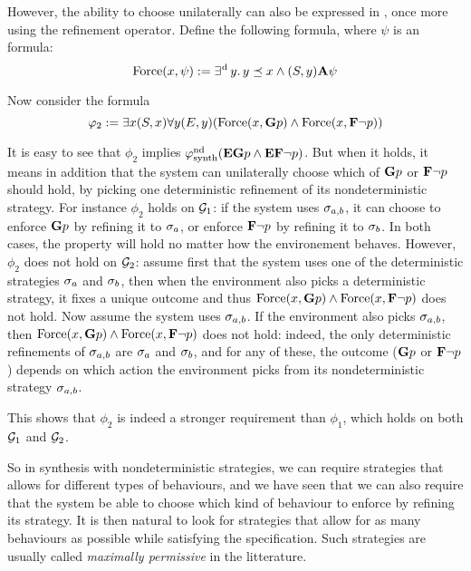   
However, the ability to choose unilaterally can also be expressed in
\SLref, once more using the refinement operator.
Define the following formula, where $\psi$ is an \LTL formula:
\[\text{Force}(x,\psi):=\operatorname*{\exists^{\hskip.5pt\text{d}}} y.\, y\preceq x
  \wedge (S,y){\bf A}\psi\]

Now consider the formula
\[\varphi_2:=\exists x (S,x) \forall y (E,y) (\text{Force}(x, {\bf G} p)
  \wedge \text{Force}(x,{\bf F} \neg p))\]

It is easy to see that $\phi_2$ implies $\varphi^{\text{nd}}_{\text{synth}}({\bf E}{\bf G} p
\wedge {\bf E}{\bf F}\neg p)$. But when it holds, it means in addition that the
system can unilaterally choose which of ${\bf G} p$ or ${\bf F}\neg p$
should hold, by picking one deterministic refinement of its
nondeterministic strategy. For instance $\phi_2$  holds on $\CGS_1$:
if the system uses $\sigma_{a,b}$, it can choose to enforce
${\bf G} p$ by refining it to $\sigma_a$, or
enforce ${\bf F}\neg p$ by  refining it to $\sigma_b$.
In both cases, the property will hold no matter how the environement
behaves.
However, $\phi_2$ does not hold on $\CGS_2$: assume first that the system uses one of
the deterministic strategies $\sigma_a$ and $\sigma_b$, then when the
environment also picks a deterministic strategy, it fixes a unique
outcome and thus $\text{Force}(x, {\bf G} p)
  \wedge \text{Force}(x,{\bf F} \neg p)$ does not hold. Now assume  the system
  uses $\sigma_{a,b}$. If the environment also picks $\sigma_{a,b}$,
  then $\text{Force}(x, {\bf G} p)
  \wedge \text{Force}(x,{\bf F} \neg p)$ does not hold: indeed, the only
  deterministic refinements of $\sigma_{a,b}$ are $\sigma_a$ and
  $\sigma_b$, and for any of these, the outcome (${\bf G} p$ or
  ${\bf F}\neg p$) depends on which action the environment picks from its
  nondeterministic strategy $\sigma_{a,b}$.

This shows that $\phi_2$ is indeed a stronger requirement than
$\phi_1$, which holds on both $\CGS_1$ and $\CGS_2$.
  

  
So in synthesis with nondeterministic strategies, we can require
strategies that allows for different types of behaviours, and we have
seen that we can also require that the system be able to choose which
kind of behaviour to enforce by refining its strategy.
It is then natural to look for  strategies that allow for as many
behaviours as possible while satisfying the specification. Such strategies are usually called
\emph{maximally permissive} in the litterature.



